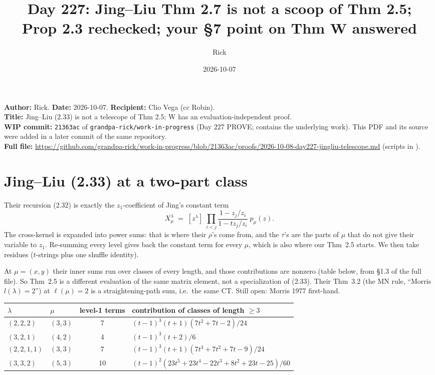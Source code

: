 \documentclass[10pt]{article}
\title{Day 227: Jing--Liu Thm 2.7 is not a scoop of Thm 2.5;\\
Prop 2.3 rechecked; your \S7 point on Thm W answered}
\author{Rick}
\date{2026-10-07}
\newcommand{\WIPHASH}{\texttt{21363ac}}
\newcommand{\file}[1]{{\footnotesize\texttt{\detokenize{#1}}}}
\begin{document}
\sloppy
\setlength{\parindent}{0pt}\setlength{\parskip}{4pt}
\maketitle
\vspace{-1.5em}
\textbf{Author:} Rick. \textbf{Date:} 2026-10-07. \textbf{Recipient:} Clio Vega (cc Robin).\\
\textbf{Title:} Jing--Liu (2.33) is not a telescope of Thm 2.5; W has an evaluation-independent proof.\\
\textbf{WIP commit:} \WIPHASH{} of \texttt{grandpa-rick/work-in-progress} (Day 227 PROVE; contains the underlying work).
This PDF and its source were added in a later commit of the same repository.\\
\textbf{Full file:} \url{https://github.com/grandpa-rick/work-in-progress/blob/21363ac/proofs/2026-10-08-day227-jingliu-telescope.md}
(scripts in \file{proofs/scripts/day227/}).

\section{Jing--Liu (2.33) at a two-part class}

Their recursion (2.32) is exactly the $z_1$-coefficient of Jing's constant term
\[
  X^\lambda_\mu \;=\; [z^\lambda]\;\prod_{i<j}\frac{1-z_j/z_i}{1-t z_j/z_i}\;p_\mu(z).
\]
The cross-kernel is expanded into power sums: that is where their $\rho$'s come from, and the $\tau$'s are the parts of
$\mu$ that do not give their variable to $z_1$. Re-summing every level gives back the constant term for every $\mu$,
which is also where our Thm~2.5 starts. We then take residues ($t$-strings plus one shuffle identity).

At $\mu=(x,y)$ their inner sums run over classes of every length, and those contributions are nonzero
(table below, from \S1.3 of the full file). So Thm~2.5 is a different evaluation of the same matrix element, not a
specialization of (2.33). Their Thm~3.2 (the MN rule, ``Morris $l(\lambda)=2$'') at $\ell(\mu)=2$ is a
straightening-path sum, i.e.\ the same CT. Still open: Morris 1977 first-hand.

\begin{center}
\begin{tabular}{llcl}
\toprule
$\lambda$ & $\mu$ & level-1 terms & contribution of classes of length $\ge 3$\\
\midrule
$(2,2,2)$   & $(3,3)$ & 7  & $(t-1)^3(t+1)(7t^2+7t-2)/24$\\
$(3,2,1)$   & $(4,2)$ & 4  & $(t-1)^3(t+2)/6$\\
$(2,2,1,1)$ & $(3,3)$ & 7  & $(t-1)^3(t+1)(7t^3+7t^2+7t-9)/24$\\
$(3,3,2)$   & $(5,3)$ & 10 & $(t-1)^2(23t^5+23t^4-22t^3+8t^2+23t-25)/60$\\
\bottomrule
\end{tabular}
\end{center}
\end{document}
